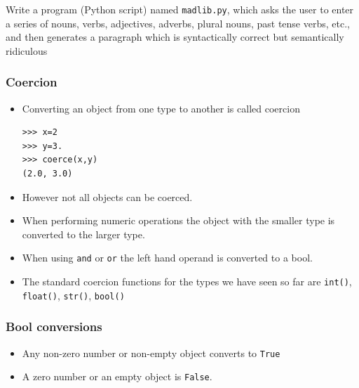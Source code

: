 \documentclass{beamer}
\begin{document}
\begin{frame}
\begin{example}
Write a program (Python script) named \texttt{madlib.py}, which asks the user to enter a series of nouns, verbs, adjectives, adverbs, plural nouns, past tense verbs, etc., and then generates a paragraph which is syntactically correct but semantically ridiculous
\end{example}
\end{frame}

\begin{frame}[containsverbatim]
\frametitle{Coercion}
\begin{itemize}
\item Converting an object from one type to another is called coercion
\begin{Verbatim}
>>> x=2
>>> y=3.
>>> coerce(x,y)
(2.0, 3.0)
\end{Verbatim}
\item However not all objects can be coerced.
\item When performing numeric operations the object with the smaller type is converted to the larger type.
\item When using \texttt{and} or \texttt{or} the left hand operand is converted to a bool.
\item The standard coercion functions for the types we have seen so far are \texttt{int()}, \texttt{float()}, \texttt{str()}, \texttt{bool()}
\end{itemize}
\end{frame}

\begin{frame}
\frametitle{Bool conversions}
\begin{itemize}
\item Any non-zero number or non-empty object converts to \texttt{True}
\item A zero number or an empty object is \texttt{False}.
\end{itemize}
\end{frame}
\end{document}
